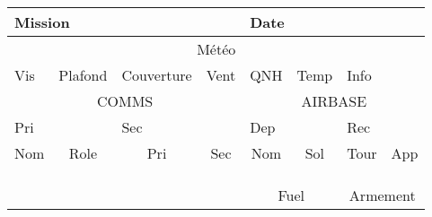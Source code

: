 \begin{tabular}{@{}llllllll@{}}
\multicolumn{4}{l}{Mission}                                                                                & \multicolumn{4}{l}{Date}                                                                                   \\ \midrule
\multicolumn{8}{c}{Météo}                                                                                                                                                                                               \\ \midrule
Vis                      & Plafond                   & Couverture               & Vent                     & QNH                      & Temp                     & Info                      &                          \\ \midrule
\multicolumn{4}{c|}{COMMS}                                                                                 & \multicolumn{4}{c}{AIRBASE}                                                                                \\ \midrule
\multicolumn{2}{l}{Pri}                              & \multicolumn{2}{l|}{Sec}                            & \multicolumn{2}{l}{Dep}                             & \multicolumn{2}{l}{Rec}                              \\ \midrule
\multicolumn{1}{c|}{Nom} & \multicolumn{1}{c|}{Role} & \multicolumn{1}{c|}{Pri} & \multicolumn{1}{c|}{Sec} & \multicolumn{1}{c|}{Nom} & \multicolumn{1}{c|}{Sol} & \multicolumn{1}{c|}{Tour} & \multicolumn{1}{c|}{App} \\ \midrule
\multicolumn{1}{l|}{}    & \multicolumn{1}{l|}{}     & \multicolumn{1}{l|}{}    & \multicolumn{1}{l|}{}    & \multicolumn{1}{l|}{}    & \multicolumn{1}{l|}{}    & \multicolumn{1}{l|}{}     &                          \\ \midrule
\multicolumn{1}{l|}{}    & \multicolumn{1}{l|}{}     & \multicolumn{1}{l|}{}    & \multicolumn{1}{l|}{}    & \multicolumn{1}{l|}{}    & \multicolumn{1}{l|}{}    & \multicolumn{1}{l|}{}     &                          \\ \midrule
\multicolumn{1}{l|}{}    & \multicolumn{1}{l|}{}     & \multicolumn{1}{l|}{}    & \multicolumn{1}{l|}{}    & \multicolumn{1}{l|}{}    & \multicolumn{1}{l|}{}    & \multicolumn{1}{l|}{}     &                          \\ \midrule
\multicolumn{1}{c|}{}    & \multicolumn{1}{c|}{}     & \multicolumn{1}{c|}{}    & \multicolumn{1}{l|}{}    & \multicolumn{2}{c|}{Fuel}                           & \multicolumn{2}{c}{Armement}                         \\ \midrule

\end{tabular}
